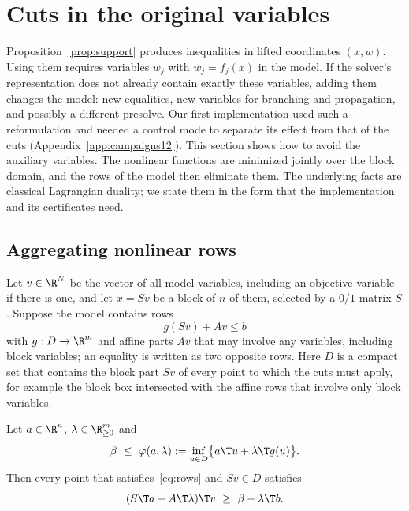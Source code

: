 \section{Cuts in the original variables}\label{sec:original}

Proposition~\ref{prop:support} produces inequalities in lifted coordinates
$(x,w)$. Using them requires variables $w_j$ with $w_j=f_j(x)$ in the model.
If the solver's representation does not already contain exactly these
variables, adding them changes the model: new equalities, new variables for
branching and propagation, and possibly a different presolve. Our first
implementation used such a reformulation and needed a control mode to
separate its effect from that of the cuts (Appendix~\ref{app:campaigns12}).
This section shows how to avoid the auxiliary variables. The nonlinear
functions are minimized jointly over the block domain, and the rows of the
model then eliminate them. The underlying facts are classical Lagrangian
duality; we state them in the form that the implementation and its
certificates need.

\subsection{Aggregating nonlinear rows}\label{sec:aggregation}

Let $v\in\R^N$ be the vector of all model variables, including an objective
variable if there is one, and let $x=Sv$ be a block of $n$ of them, selected
by a $0/1$ matrix $S$. Suppose the model contains rows
\begin{equation}\label{eq:rows}
g(Sv)+Av\le b
\end{equation}
with $g:D\to\R^m$ and affine parts $Av$ that may involve any variables,
including block variables; an equality is written as two opposite rows. Here
$D$ is a compact set that contains the block part $Sv$ of every point to
which the cuts must apply, for example the block box intersected with the
affine rows that involve only block variables.

\begin{proposition}\label{prop:aggregate}
Let $a\in\R^n$, $\lambda\in\R^m_{\ge0}$ and
\begin{equation}\label{eq:agg-support}
\beta\ \le\ \varphi(a,\lambda):=\inf_{u\in D}\bigl\{a\T u+\lambda\T g(u)\bigr\}.
\end{equation}
Then every point that satisfies~\eqref{eq:rows} and $Sv\in D$ satisfies
\begin{equation}\label{eq:agg-cut}
(S\T a-A\T\lambda)\T v\ \ge\ \beta-\lambda\T b .
\end{equation}
\end{proposition}

